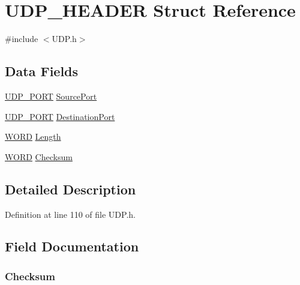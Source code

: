 \hypertarget{struct_u_d_p___h_e_a_d_e_r}{}\section{U\+D\+P\+\_\+\+H\+E\+A\+D\+E\+R Struct Reference}
\label{struct_u_d_p___h_e_a_d_e_r}


{\ttfamily \#include $<$U\+D\+P.\+h$>$}

\subsection*{Data Fields}
\begin{DoxyCompactItemize}
\item 
\hyperlink{_u_d_p_8h_abe6e72d540ec531acbd9d7d8a72922a5}{U\+D\+P\+\_\+\+P\+O\+R\+T} \hyperlink{struct_u_d_p___h_e_a_d_e_r_a6b6e2c1584b17d33bae5fdd61f5eae52}{Source\+Port}
\item 
\hyperlink{_u_d_p_8h_abe6e72d540ec531acbd9d7d8a72922a5}{U\+D\+P\+\_\+\+P\+O\+R\+T} \hyperlink{struct_u_d_p___h_e_a_d_e_r_a7249d81f4d0632c7ae87851e34d39a33}{Destination\+Port}
\item 
\hyperlink{_generic_type_defs_8h_a2b0e863dadf920709ec53d9088ee7c91}{W\+O\+R\+D} \hyperlink{struct_u_d_p___h_e_a_d_e_r_a716d105478dd9de36ec29bc981795f47}{Length}
\item 
\hyperlink{_generic_type_defs_8h_a2b0e863dadf920709ec53d9088ee7c91}{W\+O\+R\+D} \hyperlink{struct_u_d_p___h_e_a_d_e_r_a85011e0b7801556de62f34a465135806}{Checksum}
\end{DoxyCompactItemize}


\subsection{Detailed Description}


Definition at line 110 of file U\+D\+P.\+h.



\subsection{Field Documentation}
\hypertarget{struct_u_d_p___h_e_a_d_e_r_a85011e0b7801556de62f34a465135806}{}
\subsubsection[{Checksum}]{ Checksum}\label{struct_u_d_p___h_e_a_d_e_r_a85011e0b7801556de62f34a465135806}


